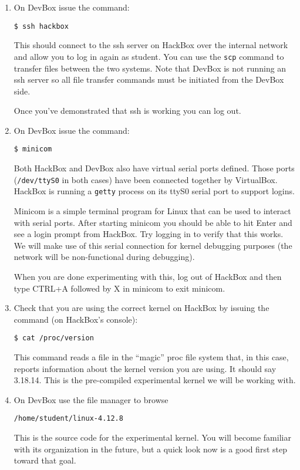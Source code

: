 \documentclass[twocolumn]{article}
\begin{document}
\begin{enumerate}
\item On DevBox issue the command:
\begin{Verbatim}
$ ssh hackbox
\end{Verbatim}
  This should connect to the ssh server on HackBox over the internal network and allow you to
  log in again as student. You can use the \texttt{scp} command to transfer files between the
  two systems. Note that DevBox is not running an ssh server so all file transfer commands must
  be initiated from the DevBox side.

  Once you've demonstrated that ssh is working you can log out.

\item On DevBox issue the command:
\begin{Verbatim}
$ minicom
\end{Verbatim}
  Both HackBox and DevBox also have virtual serial ports defined. Those ports
  (\texttt{/dev/ttyS0} in both cases) have been connected together by VirtualBox. HackBox is
  running a \texttt{getty} process on its ttyS0 serial port to support logins.

  Minicom is a simple terminal program for Linux that can be used to interact with serial ports.
  After starting minicom you should be able to hit Enter and see a login prompt from HackBox.
  Try logging in to verify that this works. We will make use of this serial connection for
  kernel debugging purposes (the network will be non-functional during debugging).

  When you are done experimenting with this, log out of HackBox and then type CTRL+A followed by
  X in minicom to exit minicom.

\item Check that you are using the correct kernel on HackBox by issuing the command (on
  HackBox's console):
\begin{Verbatim}
$ cat /proc/version
\end{Verbatim}
  This command reads a file in the ``magic'' proc file system that, in this case, reports
  information about the kernel version you are using. It should say 3.18.14. This is the
  pre-compiled experimental kernel we will be working with.

\item On DevBox use the file manager to browse
\begin{Verbatim}
/home/student/linux-4.12.8
\end{Verbatim}
  This is the source code for the experimental kernel. You will become familiar with its
  organization in the future, but a quick look now is a good first step toward that goal.


\end{enumerate}
\end{document}
